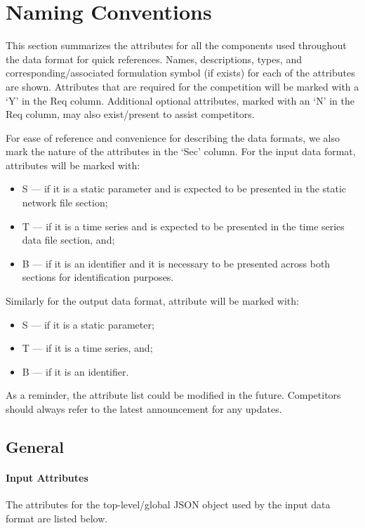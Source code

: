 \documentclass{article}
\begin{document}
\section{Naming Conventions}
\label{sec:naming}
This section summarizes the attributes for all the components used throughout the data format for quick references. 
Names, descriptions, types, and corresponding/associated formulation symbol (if exists) for each of the attributes are shown.
Attributes that are required for the competition 
will be marked with a `Y' in the Req column. 
Additional optional attributes, marked with an `N' in the Req column, may also exist/present to assist competitors.

For ease of reference and convenience for describing the data formats, we also 
mark the nature of the attributes in the `Sec' column.
For the input data format, attributes will be marked with:
\begin{itemize}
\item S --- if it is a static parameter and is expected to be presented in the static network file section;
\item T --- if it is a time series and is expected to be presented in the time series data file section, and; 
\item B --- if it is an identifier and it is necessary to be presented across both sections for identification purposes.
\end{itemize}
Similarly for the output data format, attribute will be marked with:
\begin{itemize}
\item S --- if it is a static parameter; 
\item T --- if it is a time series, and;
\item B --- if it is an identifier.
\end{itemize}
As a reminder, the attribute list could be modified in the future.
Competitors should always refer to the latest announcement for any 
updates.





\subsection{General}
\label{nom:top-level}

\paragraph{Input Attributes}
The attributes for the top-level/global JSON object 
used by the input data format are listed below.
\end{document}
